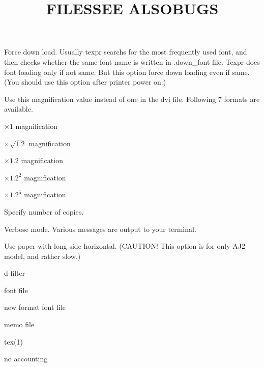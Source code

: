 Force down load. Usually texpr searchs for the most frequently used font,
and then checks whether the same font name is written in .down\_font
file. Texpr does font loading only if not same. But this option force
down loading even if same. (You should use this option after printer power
on.)

Use this magnification value instead of one in the dvi file.
Following 7 formats are available.

\smallskip{}
 $\times 1$ magnification\par
{} $\times \sqrt{1.2}$ magnification\par
{} $\times 1.2$ magnification\par
{} $\times 1.2^2$ magnification\par
\xitem{\tt\ \vdots}\par
{} $\times 1.2^5$ magnification\par

Specify number of copies.

Verbose mode. Various messages are output to your terminal.

Use paper with long side horizontal.
(CAUTION! This option is for only AJ2 model, and rather slow.)

\title{FILES}
 d-filter\par
{} font file\par
{} new format font file\par
{} memo file\par

\title{SEE ALSO}
tex(1)
\title{BUGS}
no accounting

\bye

